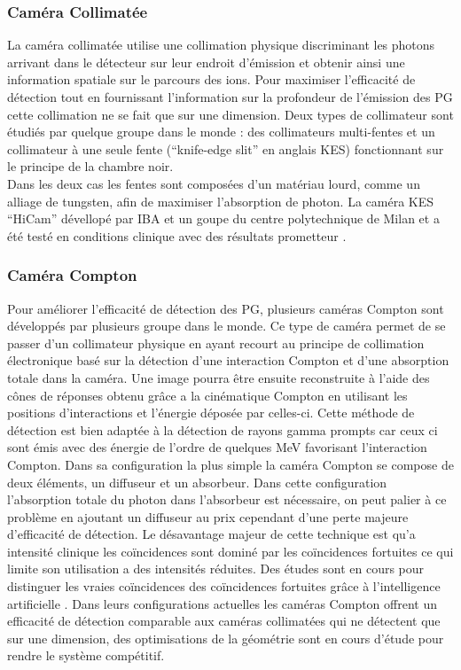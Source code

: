 \documentclass[11pt,a4paper,oldfontcommands]{memoir}
\begin{document}
\subsubsection{Caméra Collimatée}
La caméra collimatée utilise une collimation physique discriminant les photons arrivant dans le détecteur sur leur endroit d'émission et obtenir ainsi une information spatiale sur le parcours des ions. Pour maximiser l’efficacité de détection tout en fournissant l'information sur la profondeur de l’émission des PG cette collimation ne se fait que sur une dimension. Deux types de collimateur sont étudiés par quelque groupe dans le monde : des collimateurs multi-fentes \cite{Pinto_2014,MinSimu} et un collimateur à une seule fente (\enquote{knife-edge slit} en anglais KES)\cite{Smeets_2012} fonctionnant sur le principe de la chambre noir.\\
Dans les deux cas les fentes sont composées d'un matériau lourd, comme un alliage de tungsten, afin de maximiser l'absorption de photon. 
La caméra KES \enquote{HiCam} dévellopé par IBA et un goupe du centre polytechnique de Milan et a été testé en conditions clinique avec des résultats prometteur \cite{Richter2016}.

\subsubsection{Caméra Compton}
Pour améliorer l’efficacité de détection des PG, plusieurs caméras Compton sont développés par plusieurs groupe dans le monde. Ce type de caméra permet de se passer d'un collimateur physique en ayant recourt au principe de collimation électronique basé sur la détection d'une interaction Compton et d'une absorption totale dans la caméra. Une image pourra être ensuite reconstruite à l'aide des cônes de réponses obtenu grâce a la cinématique Compton en utilisant les positions d’interactions et l'énergie déposée par celles-ci. Cette méthode de détection est bien adaptée à la détection de rayons gamma prompts car ceux ci sont émis avec des énergie de l'ordre de quelques MeV favorisant l'interaction Compton. Dans sa configuration la plus simple la caméra Compton se compose de deux éléments, un diffuseur et un absorbeur. Dans cette configuration l'absorption totale du photon dans l'absorbeur est nécessaire, on peut palier à ce problème en ajoutant un diffuseur au prix cependant d'une perte majeure d'efficacité de détection. Le désavantage majeur de cette technique est qu'a intensité clinique les coïncidences sont dominé par les coïncidences fortuites ce qui limite son utilisation a des intensités réduites. Des études sont en cours pour distinguer les vraies coïncidences des coïncidences fortuites grâce à l'intelligence artificielle \cite{Fontana_2020}. Dans leurs configurations actuelles les caméras Compton offrent un efficacité de détection comparable aux caméras collimatées qui ne détectent que sur une dimension, des optimisations de la géométrie sont en cours d'étude pour rendre le système compétitif. 
\end{document}
